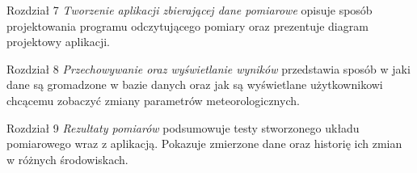 Rozdział 7 \textit{Tworzenie aplikacji zbierającej dane pomiarowe} opisuje sposób projektowania programu odczytującego pomiary oraz prezentuje diagram projektowy aplikacji.


Rozdział 8 \textit{Przechowywanie oraz wyświetlanie wyników} przedstawia sposób w jaki dane są gromadzone w bazie danych oraz jak są wyświetlane użytkownikowi chcącemu zobaczyć zmiany parametrów meteorologicznych.


Rozdział 9 \textit{Rezultaty pomiarów} podsumowuje testy stworzonego układu pomiarowego wraz z aplikacją. Pokazuje zmierzone dane oraz historię ich zmian w różnych środowiskach.